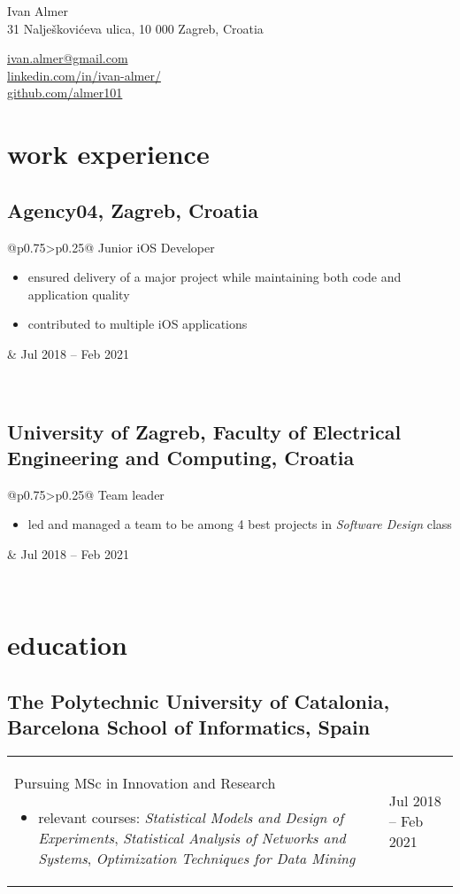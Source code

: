 \documentclass[a4paper]{article}
\makeatletter
\newlength{\tablewidth}
\newenvironment{period}[2]{%
\newcommand{\sarma}{#2}%
\setlength{\tablewidth}{\linewidth}
\addtolength{\tablewidth}{-2\tabcolsep}
\begin{tabular}{@{}p{0.75\tablewidth}>{\raggedleft\arraybackslash}p{0.25\tablewidth}@{}}%
#1 \newline
\begin{itemize}
}{%
\end{itemize} & \sarma \\%
\end{tabular}\\
}
\makeatother
\begin{document}
\fontfamily{\sfdefault}
\selectfont

\begin{minipage}{.5\textwidth}
\LARGE{Ivan Almer}\\
\normalsize{31 Nalješkovićeva ulica, 10 000 Zagreb, Croatia}
\end{minipage}%
\begin{minipage}{.5\textwidth}
\raggedleft
\href{mailto:ivan.almer@gmail.com}{ivan.almer@gmail.com} \\
\href{https://www.linkedin.com/in/ivan-almer/}{linkedin.com/in/ivan-almer/} \\
\href{https://github.com/almer101}{github.com/almer101} \\
\end{minipage}

\vspace{1em}

\section{work experience}
\subsection{Agency04, Zagreb, Croatia}
\begin{period}{Junior iOS Developer}{Jul 2018 -- Feb 2021}
    \item
        ensured delivery of a major project while maintaining both code and application quality
    \item
        contributed to multiple iOS applications
\end{period}

\subsection{University of Zagreb, Faculty of Electrical Engineering and Computing, Croatia}
\begin{period}{Team leader}{Sep 2018 -- Jan 2019}
    \item led and managed a team to be among 4 best projects in \textit{Software Design} class
\end{period}

\section{education}
\subsection{The Polytechnic University of Catalonia, Barcelona School of Informatics, Spain}
\begin{period}{Pursuing MSc in Innovation and Research}{Sep 2020 -- Jan 2021}
    \item relevant courses:
        \textit{Statistical Models and Design of Experiments},
        \textit{Statistical Analysis of Networks and Systems},
        \textit{Optimization Techniques for Data Mining}
\end{period}
\end{document}
